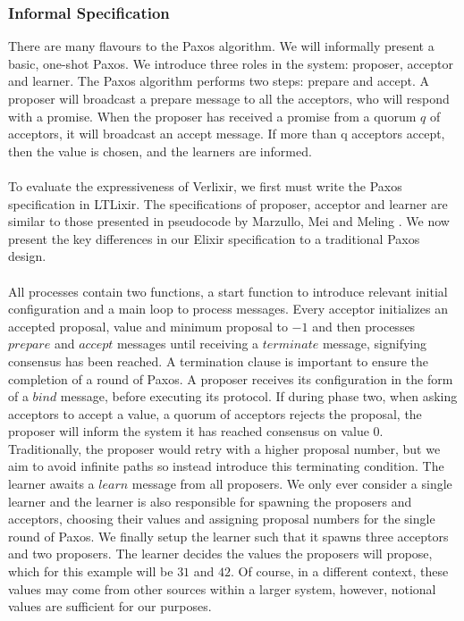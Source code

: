 \subsubsection{Informal Specification}
There are many flavours to the Paxos algorithm. We will informally present a basic, one-shot Paxos. We introduce three roles in the system: proposer, acceptor and learner. The Paxos algorithm performs two steps: prepare and accept. A proposer will broadcast a prepare message to all the acceptors, who will respond with a promise. When the proposer has received a promise from a quorum $q$ of acceptors, it will broadcast an accept message. If more than q acceptors accept, then the value is chosen, and the learners are informed.
\\ \\
To evaluate the expressiveness of Verlixir, we first must write the Paxos specification in LTLixir. The specifications of proposer, acceptor and learner are similar to those presented in pseudocode by Marzullo, Mei and Meling \cite{Paxos_pseudocode}. We now present the key differences in our Elixir specification to a traditional Paxos design.
\\ \\
All processes contain two functions, a start function to introduce relevant initial configuration and a main loop to process messages. Every acceptor initializes an accepted proposal, value and minimum proposal to $-1$ and then processes $prepare$ and $accept$ messages until receiving a $terminate$ message, signifying consensus has been reached. A termination clause is important to ensure the completion of a round of Paxos. A proposer receives its configuration in the form of a $bind$ message, before executing its protocol. If during phase two, when asking acceptors to accept a value, a quorum of acceptors rejects the proposal, the proposer will inform the system it has reached consensus on value $0$. Traditionally, the proposer would retry with a higher proposal number, but we aim to avoid infinite paths so instead introduce this terminating condition. The learner awaits a $learn$ message from all proposers. We only ever consider a single learner and the learner is also responsible for spawning the proposers and acceptors, choosing their values and assigning proposal numbers for the single round of Paxos. We finally setup the learner such that it spawns three acceptors and two proposers. The learner decides the values the proposers will propose, which for this example will be $31$ and $42$. Of course, in a different context, these values may come from other sources within a larger system, however, notional values are sufficient for our purposes.
